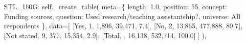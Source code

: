 \documentclass[
  11pt,
  a4paper,
]{article}
\newenvironment{Shaded}{\begin{snugshade}}{\end{snugshade}}
\newcommand{\NormalTok}[1]{\textcolor[rgb]{0.00,0.23,0.31}{#1}}
\newcommand{\OperatorTok}[1]{\textcolor[rgb]{0.37,0.37,0.37}{#1}}
\newcommand{\StringTok}[1]{\textcolor[rgb]{0.13,0.47,0.30}{#1}}
\newcommand{\VariableTok}[1]{\textcolor[rgb]{0.07,0.07,0.07}{#1}}
\begin{document}
\begin{Shaded}
\begin{Highlighting}[]
            \StringTok{\textquotesingle{}STL\_160G\textquotesingle{}}\NormalTok{: }\VariableTok{self}\NormalTok{.\_create\_table(}
\NormalTok{                meta}\OperatorTok{=}\NormalTok{\{}
                    \StringTok{\textquotesingle{}length\textquotesingle{}}\NormalTok{: }\StringTok{\textquotesingle{}1.0\textquotesingle{}}\NormalTok{, }\StringTok{\textquotesingle{}position\textquotesingle{}}\NormalTok{: }\StringTok{\textquotesingle{}55\textquotesingle{}}\NormalTok{,}
                    \StringTok{\textquotesingle{}concept\textquotesingle{}}\NormalTok{: }\StringTok{\textquotesingle{}Funding sources\textquotesingle{}}\NormalTok{,}
                    \StringTok{\textquotesingle{}question\textquotesingle{}}\NormalTok{: }\StringTok{\textquotesingle{}Used research/teaching assistantship?\textquotesingle{}}\NormalTok{,}
                    \StringTok{\textquotesingle{}universe\textquotesingle{}}\NormalTok{: }\StringTok{\textquotesingle{}All respondents\textquotesingle{}}
\NormalTok{                \},}
\NormalTok{                data}\OperatorTok{=}\NormalTok{[}
\NormalTok{                    [}\StringTok{\textquotesingle{}Yes\textquotesingle{}}\NormalTok{, }\StringTok{\textquotesingle{}1\textquotesingle{}}\NormalTok{, }\StringTok{\textquotesingle{}1,896\textquotesingle{}}\NormalTok{, }\StringTok{\textquotesingle{}39,471\textquotesingle{}}\NormalTok{, }\StringTok{\textquotesingle{}7.4\textquotesingle{}}\NormalTok{],}
\NormalTok{                    [}\StringTok{\textquotesingle{}No\textquotesingle{}}\NormalTok{, }\StringTok{\textquotesingle{}2\textquotesingle{}}\NormalTok{, }\StringTok{\textquotesingle{}13,865\textquotesingle{}}\NormalTok{, }\StringTok{\textquotesingle{}477,888\textquotesingle{}}\NormalTok{, }\StringTok{\textquotesingle{}89.7\textquotesingle{}}\NormalTok{],}
\NormalTok{                    [}\StringTok{\textquotesingle{}Not stated\textquotesingle{}}\NormalTok{, }\StringTok{\textquotesingle{}9\textquotesingle{}}\NormalTok{, }\StringTok{\textquotesingle{}377\textquotesingle{}}\NormalTok{, }\StringTok{\textquotesingle{}15,354\textquotesingle{}}\NormalTok{, }\StringTok{\textquotesingle{}2.9\textquotesingle{}}\NormalTok{],}
\NormalTok{                    [}\StringTok{\textquotesingle{}Total\textquotesingle{}}\NormalTok{, }\StringTok{\textquotesingle{}\textquotesingle{}}\NormalTok{, }\StringTok{\textquotesingle{}16,138\textquotesingle{}}\NormalTok{, }\StringTok{\textquotesingle{}532,714\textquotesingle{}}\NormalTok{, }\StringTok{\textquotesingle{}100.0\textquotesingle{}}\NormalTok{]}
\NormalTok{                ]}
\NormalTok{            ),}
            

\end{Highlighting}
\end{Shaded}
\end{document}
